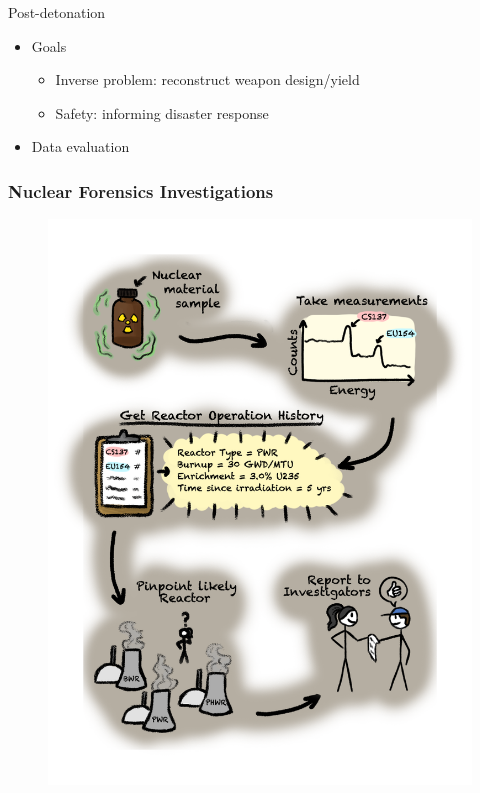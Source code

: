 \begin{frame}
\begin{adjustwidth}{-10pt}{0pt}
\begin{minipage}[t]{0.5\textwidth}
\begin{block}{Post-detonation}
\begin{itemize}
        \item Goals
        \begin{itemize}
          \item Inverse problem: reconstruct weapon design/yield
          \item Safety: informing disaster response
        \end{itemize}
        \item Data evaluation
      \end{itemize}
    \end{block}
  \end{minipage}
  \end{adjustwidth}
\end{frame}

\begin{frame}
  \frametitle{Nuclear Forensics Investigations}
  \vspace{-5mm}
  \begin{figure}
    \centering
    \includegraphics[height=0.98\textheight]{./figures/nf-workflow.png}
  \end{figure}
\end{frame}

